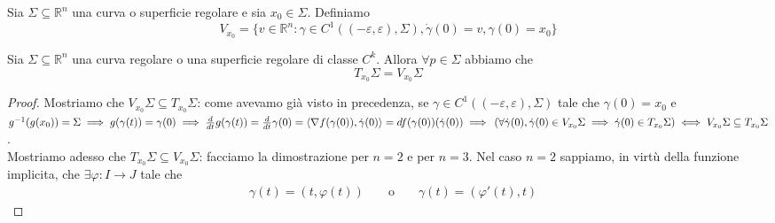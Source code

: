 \begin{definition}
Sia $\Sigma \subseteq \mathbb{R}^n$ una curva o superficie regolare e sia $x_0 \in \Sigma$. Definiamo
$$
V_{x_0} = \{ v \in \mathbb{R}^n: \gamma \in C^{1}((-\varepsilon, \varepsilon), \Sigma), \dot{\gamma}(0) = v, \gamma(0) = x_0 \}
$$
\end{definition}
\begin{theorem}
Sia $\Sigma \subseteq \mathbb{R}^n$ una curva regolare o una superficie regolare di classe $C^k$. Allora $\forall p \in \Sigma$ abbiamo che
$$
T_{x_0} \Sigma = V_{x_0} \Sigma
$$
\label{thm:caratt_tang}
\end{theorem}
\begin{proof}
Mostriamo che $V_{x_0} \Sigma \subseteq T_{x_0} \Sigma$: come avevamo già visto in precedenza, se $\gamma \in C^{1}((-\varepsilon, \varepsilon), \Sigma)$ tale che $\gamma(0)=x_0$ e $g^{-1}(g(x_0)) = \Sigma \implies g(\gamma(t)) = \gamma(0) \implies \frac{d}{dt} g(\gamma(t)) = \frac{d}{dt} \gamma(0) = \langle \nabla f(\gamma(0)), \dot{\gamma}(0) \rangle = df(\gamma(0))(\dot{\gamma}(0)) \implies \, (\forall \dot{\gamma}(0), \dot{\gamma}(0) \in V_{x_0} \Sigma \implies \dot{\gamma}(0) \in T_{x_0} \Sigma) \iff V_{x_0} \Sigma \subseteq T_{x_0} \Sigma$. \\
Mostriamo adesso che $T_{x_0} \Sigma \subseteq V_{x_0} \Sigma$: facciamo la dimostrazione per $n=2$ e per $n=3$. Nel caso $n=2$ sappiamo, in virtù della funzione implicita, che $\exists \varphi: I \to J$ tale che 
\begin{align*}
&\gamma(t) = (t, \varphi(t)) & &\text{ o } & &\gamma(t)=(\varphi'(t), t)
\end{align*}


\end{proof}
